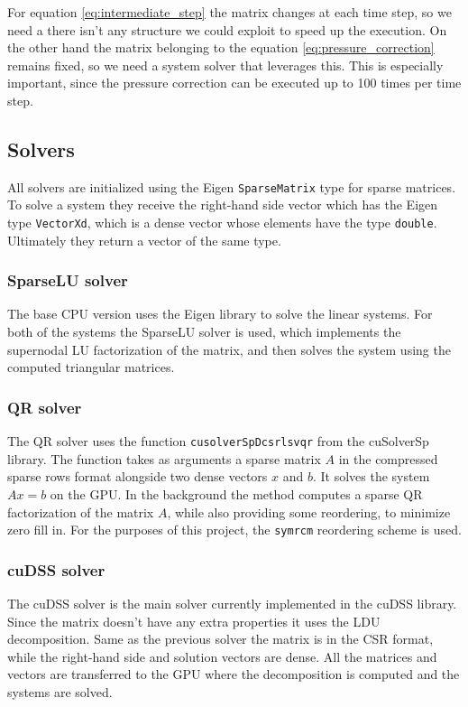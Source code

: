 \documentclass{article}
\begin{document}
For equation \ref{eq:intermediate_step} the matrix changes at each time step, so we need 
a there isn't any structure we could exploit to speed up the execution. On the other hand 
the matrix belonging to the equation \ref{eq:pressure_correction} remains fixed, so 
we need a system solver that leverages this. This is especially important, since 
the pressure correction can be executed up to 100 times per time step.


\subsection{Solvers}
All solvers are initialized using the Eigen \verb|SparseMatrix| type for sparse matrices. 
To solve a system they receive the right-hand side vector which has the Eigen type \verb|VectorXd|,
which is a dense vector whose elements have the type \verb|double|. Ultimately they return 
a vector of the same type.
\subsubsection{SparseLU solver}
The base CPU version uses the Eigen library to solve the linear systems. For both of the systems 
the SparseLU solver is used, which implements the supernodal LU factorization of the matrix, and then
solves the system using the computed triangular matrices.
\subsubsection{QR solver}
The QR solver uses the function \verb|cusolverSpDcsrlsvqr| from the cuSolverSp library. 
The function takes as arguments a sparse matrix \(A\) in the 
compressed sparse rows format alongside two dense vectors \(x\) and \(b\). It solves the 
system \(Ax=b\) on the GPU. In the background the method computes a sparse QR factorization of the matrix \(A\),
while also providing some reordering, to minimize zero fill in. For the purposes of this project,
the \verb|symrcm| reordering scheme is used.
\subsubsection{cuDSS solver}
The cuDSS solver is the main solver currently implemented in the cuDSS library. Since the matrix 
doesn't have any extra properties it uses the LDU decomposition. Same as the previous 
solver the matrix is in the CSR format, while the right-hand side and solution vectors
are dense. All the matrices and vectors are transferred to the GPU where the decomposition is 
computed and the systems are solved.
\end{document}
